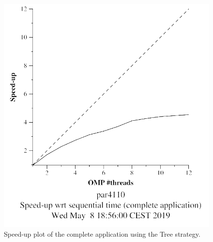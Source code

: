 \documentclass[12pt, a4paper]{article}
\begin{document}
\begin{figure}[H]
\centering
\begin{minipage}[b]{0.4\linewidth}
  \centering
  \includegraphics[scale=0.5]{./S2/S2_strong_scalability/multisort-omp-strong_boada-4_tree_cutoff_complete_application}
  \caption{Speed-up plot of the complete application using the Tree strategy.}
  \label{fig:mandel-omp-10000-strong-21-time}
\end{minipage}%
\hspace{0.5cm}
\begin{minipage}[b]{0.4\linewidth}
  \centering

\end{minipage}
\end{figure}
\end{document}
